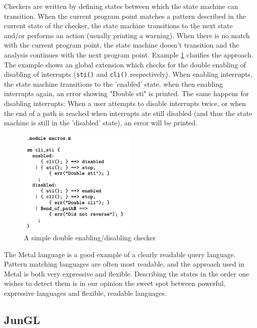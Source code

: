 Checkers are written by defining states between which the state machine can transition. When the current program point matches a pattern described in the current state of the checker, the state machine transitions to the next state and/or performs an action (usually printing a warning). When there is no match with the current program point, the state machine doesn't transition and the analysis continues with the next program point. Example \ref{fig:Metal} clarifies the approach. The example shows an global extension which checks for the double enabling of disabling of interrupts (\texttt{sti()} and \texttt{cli()} respectively). When enabling interrupts, the state machine transitions to the 'enabled' state. when then enabling interrupts again, an error showing "Double sti" is printed. The same happens for disabling interrupts: When a user attempts to disable interrupts twice, or when the end of a path is reached when interrupts ate still disabled (and thus the state machine is still in the 'disabled' state), an error will be printed.

\begin{figure}[!ht]
    \centering
      \includegraphics[width=0.5\textwidth]{images/Metal} 
      \caption{A simple double enabling/disabling checker}
    \label{fig:Metal}
\end{figure}

The Metal language is a good example of a clearly readable query language. Pattern matching languages are often most readable, and the approach used in Metal is both very expressive and flexible. Describing the states in the order one wishes to detect them is in our opinion the sweet spot between powerful, expressive languages and flexible, readable languages.

\subsection*{JunGL}

